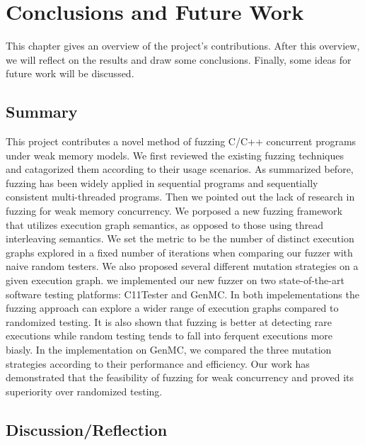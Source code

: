 \chapter{\label{cha:conclusion}Conclusions and Future
  Work}

This chapter gives an overview of the project's contributions. After
this overview, we will reflect on the results and draw some
conclusions. Finally, some ideas for future work will be discussed.

\section{Summary}

This project contributes a novel method of fuzzing C/C++ concurrent programs under weak memory models. We first reviewed the existing fuzzing techniques and catagorized them according to their usage scenarios. As summarized before, fuzzing has been widely applied in sequential programs and sequentially consistent multi-threaded programs. Then we pointed out the lack of research in fuzzing for weak memory concurrency. We porposed a new fuzzing framework that utilizes execution graph semantics, as opposed to those using thread interleaving semantics. We set the metric to be the number of distinct execution graphs explored in a fixed number of iterations when comparing our fuzzer with naive random testers. We also proposed several different mutation strategies on a given execution graph. we implemented our new fuzzer on two state-of-the-art software testing platforms: C11Tester and GenMC. In both impelementations the fuzzing approach can explore a wider range of execution graphs compared to randomized testing. It is also shown that fuzzing is better at detecting rare executions while random testing tends to fall into ferquent executions more biasly. In the implementation on GenMC, we compared the three mutation strategies according to their performance and efficiency. Our work has demonstrated that the feasibility of fuzzing for weak concurrency and proved its superiority over randomized testing. 



\section{Discussion/Reflection}

